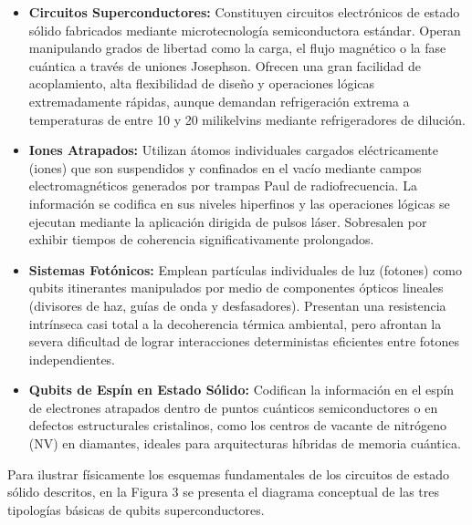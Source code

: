 \documentclass[12pt,a4paper]{article}
\begin{document}
\begin{itemize}
    \item \textbf{Circuitos Superconductores:} Constituyen circuitos electrónicos de estado sólido fabricados mediante microtecnología semiconductora estándar. Operan manipulando grados de libertad como la carga, el flujo magnético o la fase cuántica a través de uniones Josephson. Ofrecen una gran facilidad de acoplamiento, alta flexibilidad de diseño y operaciones lógicas extremadamente rápidas, aunque demandan refrigeración extrema a temperaturas de entre 10 y 20 milikelvins mediante refrigeradores de dilución.
    
    \item \textbf{Iones Atrapados:} Utilizan átomos individuales cargados eléctricamente (iones) que son suspendidos y confinados en el vacío mediante campos electromagnéticos generados por trampas Paul de radiofrecuencia. La información se codifica en sus niveles hiperfinos y las operaciones lógicas se ejecutan mediante la aplicación dirigida de pulsos láser. Sobresalen por exhibir tiempos de coherencia significativamente prolongados.
    
    \item \textbf{Sistemas Fotónicos:} Emplean partículas individuales de luz (fotones) como qubits itinerantes manipulados por medio de componentes ópticos lineales (divisores de haz, guías de onda y desfasadores). Presentan una resistencia intrínseca casi total a la decoherencia térmica ambiental, pero afrontan la severa dificultad de lograr interacciones deterministas eficientes entre fotones independientes.
    
    \item \textbf{Qubits de Espín en Estado Sólido:} Codifican la información en el espín de electrones atrapados dentro de puntos cuánticos semiconductores o en defectos estructurales cristalinos, como los centros de vacante de nitrógeno (NV) en diamantes, ideales para arquitecturas híbridas de memoria cuántica.
\end{itemize}

Para ilustrar físicamente los esquemas fundamentales de los circuitos de estado sólido descritos, en la Figura 3 se presenta el diagrama conceptual de las tres tipologías básicas de qubits superconductores.
\end{document}
